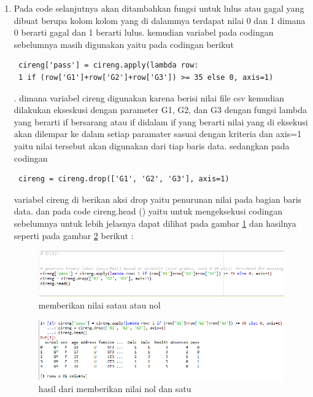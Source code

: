\begin{enumerate}
\item Pada code selanjutnya akan ditambahkan fungsi untuk lulus atau gagal yang dibuat berupa kolom kolom yang di dalammya terdapat nilai 0 dan 1 dimana 0 berarti gagal dan 1 berarti lulus. kemudian variabel pada codingan sebelumnya masih digunakan yaitu pada codingan berikut \begin{verbatim} cireng['pass'] = cireng.apply(lambda row:
 1 if (row['G1']+row['G2']+row['G3']) >= 35 else 0, axis=1) \end{verbatim}. dimana variabel cireng digunakan karena berisi nilai file csv kemudian dilakukan ekseskusi dengan parameter G1, G2, dan G3 dengan fungsi lambda yang berarti if bersarang atau if didalam if yang berarti nilai yang di eksekusi akan dilempar ke dalam setiap paramater sasuai dengan kriteria dan axis=1 yaitu nilai tersebut akan digunakan dari tiap baris data. sedangkan pada codingan \begin{verbatim} cireng = cireng.drop(['G1', 'G2', 'G3'], axis=1) \end{verbatim} variabel cireng di berikan aksi drop yaitu penurunan nilai pada bagian baris data. dan pada code cireng.head () yaitu untuk mengeksekusi codingan sebelumnya untuk lebih jelasnya dapat dilihat pada gambar \ref{c20} dan hasilnya seperti pada gambar \ref{hasil2} berikut :

\begin{figure}[ht]
      \centerline{\includegraphics[width=1\textwidth]
      {figures/cokro/c20}}
      \caption{memberikan nilai satau atau nol}
      \label{c20}
      \end{figure}

\begin{figure}[ht]
      \centerline{\includegraphics[width=1\textwidth]
      {figures/cokro/hasil2}}
      \caption{hasil dari memberikan nilai nol dan satu}
      \label{hasil2}
      \end{figure}


\end{enumerate}
